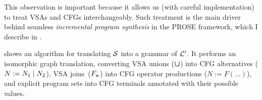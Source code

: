 This observation is important because it allows us (with careful implementation) to treat VSAs and CFGs interchangeably.
Such treatment is the main driver behind seamless \emph{incremental program synthesis} in the PROSE framework, which I
describe in .

 shows an algorithm for translating $\mathcal{S}$ into a grammar of $\mathcal{L}'$.
It performs an isomorphic graph translation, converting VSA unions ($\bm{\mathsf{\cup}}$) into CFG alternatives ($N := N_1 \;|\;
N_2$), VSA joins~($F_{\text{\tiny\ensuremath{\Join}}}$) into CFG operator productions ($N := F(\dots)$), and explicit program sets into CFG
terminals annotated with their possible values.
